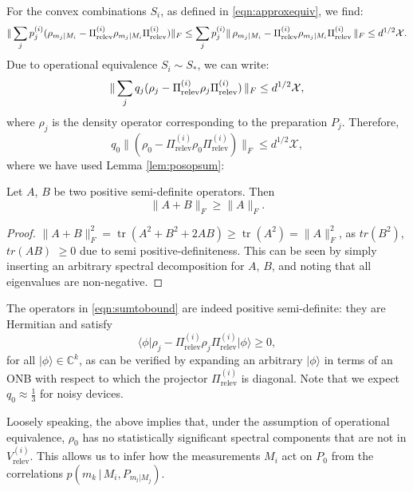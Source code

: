 For the convex combinations $S_i$, as defined in \ref{eqn:approxequiv}, we find:
\begin{equation*}
\|\sum_j p_j^{(i)}(\rho_{m_j\vert M_i}-\Pi_{\text{relev}}^{(i)}\rho_{m_j\vert M_i}\Pi_{\text{relev}}^{(i)})\|_F \leq \sum_j p_j^{(i)}\|\thinspace\rho_{m_j\vert M_i}-\Pi_{\text{relev}}^{(i)}\rho_{m_j\vert M_i}\Pi_{\text{relev}}^{(i)}\thinspace\|_F \leq d^{1/2}\mathcal{X}.
\end{equation*}
Due to operational equivalence $S_i\sim S_{*}$, we can write:
\begin{equation*}
\|\sum_j q_j(\rho_{j}-\Pi_{\text{relev}}^{(i)}\rho_{j}\Pi_{\text{relev}}^{(i)})\thinspace\|_F \leq d^{1/2}\mathcal{X},
\end{equation*}
where $\rho_{j}$ is the density operator corresponding to the preparation $P_j$.
Therefore,
\begin{equation}
\label{eqn:sumtobound}
q_0\|(\rho_{0}-\Pi_{\text{relev}}^{(i)}\rho_{0}\Pi_{\text{relev}}^{(i)})\|_F \leq d^{1/2}\mathcal{X},
\end{equation}
where we have used Lemma \ref{lem:posopsum}:
\begin{lemma}
\label{lem:posopsum}
Let $A$, $B$ be two positive semi-definite operators. Then
\begin{equation*}
\|A+B\|_F \geq \|A\|_F.
\end{equation*}
\end{lemma}
\begin{proof}
$\|A+B\|_F^2=\operatorname{tr}(A^2+B^2+2AB)\geq \operatorname{tr}(A^2)=\|A\|_F^2$, as $tr(B^2)$, $tr(AB)$ $\geq 0$ due to semi positive-definiteness. This can be seen by simply inserting an arbitrary spectral decomposition for $A$, $B$, and noting that all eigenvalues are non-negative.
\end{proof}
The operators in \ref{eqn:sumtobound} are indeed positive semi-definite: they are Hermitian and satisfy
\begin{equation*}
\langle \phi \vert \rho_{j}-\Pi_{\text{relev}}^{(i)}\rho_{j}\Pi_{\text{relev}}^{(i)} \vert \phi \rangle \geq 0,
\end{equation*}
for all $\vert \phi\rangle\in\mathbb{C}^k$, as can be verified by expanding an arbitrary $\vert \phi \rangle $ in terms of an ONB with respect to which the projector $\Pi_{\text{relev}}^{(i)}$ is diagonal. Note that we expect $q_0\approx\frac{1}{3}$ for noisy devices.

Loosely speaking, the above implies that, under the assumption of operational equivalence, $\rho_0$ has no statistically significant spectral components that are not in $V_{\text{relev}}^{(i)}$. This allows us to infer how the measurements $M_i$ act on $P_0$ from the correlations $p(m_k \, \vert \, M_i , P_{m_l\vert M_j} )$.

